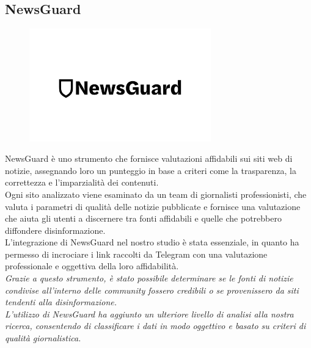 \documentclass[12pt]{article}
\begin{document}
	\subsection{NewsGuard}
	\begin{figure}[H]
	\centering
	\includegraphics[width=0.7\textwidth]{immagini/newsguard}
	\end{figure}
	NewsGuard è uno strumento che fornisce valutazioni affidabili sui siti web di notizie, assegnando loro un punteggio in base a criteri come la trasparenza, la correttezza e l'imparzialità dei contenuti. \\Ogni sito analizzato viene esaminato da un team di giornalisti professionisti, che valuta i parametri di qualità delle notizie pubblicate e fornisce una valutazione che aiuta gli utenti a discernere tra fonti affidabili e quelle che potrebbero diffondere disinformazione.\\ L'integrazione di NewsGuard nel nostro studio è stata essenziale, in quanto ha permesso di incrociare i link raccolti da Telegram con una valutazione professionale e oggettiva della loro affidabilità. \\
	\textit{Grazie a questo strumento, è stato possibile determinare se le fonti di notizie condivise all'interno delle community fossero credibili o se provenissero da siti tendenti alla disinformazione. \\L'utilizzo di NewsGuard ha aggiunto un ulteriore livello di analisi alla nostra ricerca, consentendo di classificare i dati in modo oggettivo e basato su criteri di qualità giornalistica.}
\end{document}
